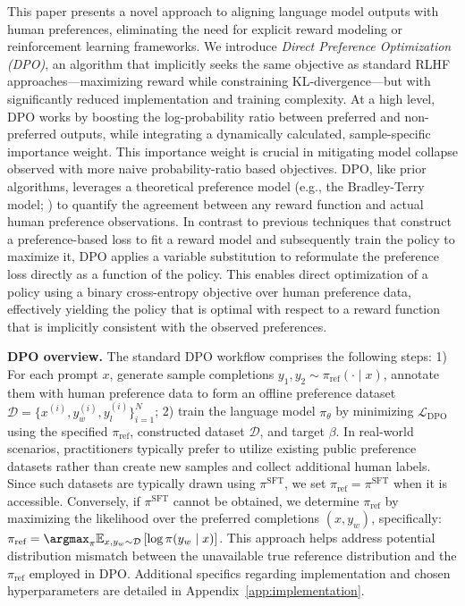 This paper presents a novel approach to aligning language model outputs with human preferences, eliminating the need for explicit reward modeling or reinforcement learning frameworks. We introduce \textit{{Direct Preference Optimization} (DPO)}, an algorithm that implicitly seeks the same objective as standard RLHF approaches—maximizing reward while constraining KL-divergence—but with significantly reduced implementation and training complexity. At a high level, DPO works by boosting the log-probability ratio between preferred and non-preferred outputs, while integrating a dynamically calculated, sample-specific importance weight. This importance weight is crucial in mitigating model collapse observed with more naive probability-ratio based objectives. DPO, like prior algorithms, leverages a theoretical preference model (e.g., the Bradley-Terry model; \cite{bradley1952rankanalysis}) to quantify the agreement between any reward function and actual human preference observations. In contrast to previous techniques that construct a preference-based loss to fit a reward model and subsequently train the policy to maximize it, DPO applies a variable substitution to reformulate the preference loss directly as a function of the policy. This enables direct optimization of a policy using a binary cross-entropy objective over human preference data, effectively yielding the policy that is optimal with respect to a reward function that is implicitly consistent with the observed preferences.

\textbf{DPO overview.} The standard DPO workflow comprises the following steps: 1) For each prompt $x$, generate sample completions $y_1, y_2 \sim \pi_\text{ref}(\cdot \mid x)$, annotate them with human preference data to form an offline preference dataset $\mathcal{D} = \{x^{(i)}, y_w^{(i)}, y_l^{(i)}\}_{i=1}^N$; 2) train the language model $\pi_\theta$ by minimizing $\mathcal{L}_\text{DPO}$ using the specified $\pi_\text{ref}$, constructed dataset $\mathcal{D}$, and target $\beta$. 
In real-world scenarios, practitioners typically prefer to utilize existing public preference datasets rather than create new samples and collect additional human labels. Since such datasets are typically drawn using $\pi^\text{SFT}$, we set $\pi_\text{ref} = \pi^\text{SFT}$ when it is accessible. Conversely, if $\pi^\text{SFT}$ cannot be obtained, we determine $\pi_\text{ref}$ by maximizing the likelihood over the preferred completions ${(x, y_w)}$, specifically: ${\pi_\text{ref} = \argmax_{\pi}\mathbb{E}_{x, y_w \sim \mathcal{D}}\left[\log \pi(y_w \mid x)\right]}$. This approach helps address potential distribution mismatch between the unavailable true reference distribution and the $\pi_\text{ref}$ employed in DPO. Additional specifics regarding implementation and chosen hyperparameters are detailed in Appendix~\ref{app:implementation}.


